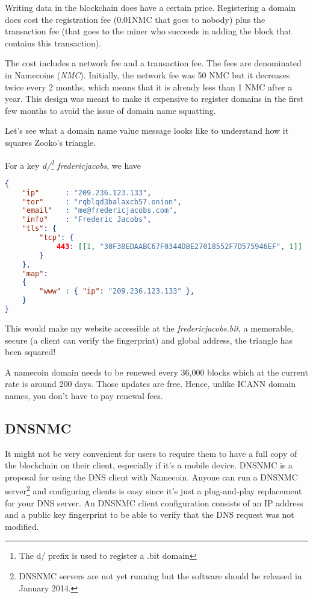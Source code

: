 \documentclass{vldb}
\begin{document}
Writing data in the blockchain does have a certain price. Registering a domain does cost the registration fee (0.01NMC that goes to nobody) plus the transaction fee (that goes to the miner who succeeds in adding the block that contains this transaction).

The cost includes a network fee and a transaction fee. The fees are denominated in Namecoins (\emph{NMC}). Initially, the network fee was 50 NMC but it decreases twice every 2 months, which means that it is already less than 1 NMC after a year. This design was meant to make it expensive to register domains in the first few months to avoid the issue of domain name squatting.

Let's see what a domain name value message looks like to understand how it squares Zooko's triangle.

For a key \emph{d/\footnote{The d/ prefix is used to register a .bit domain} fredericjacobs}, we have 

\begin{lstlisting}[language=json,firstnumber=1]
{
    "ip"      : "209.236.123.133",
    "tor"     : "rqblqd3balaxcb57.onion",
    "email"   : "me@fredericjacobs.com",
    "info"    : "Frederic Jacobs",
    "tls": {
        "tcp": {
            443: [[1, "30F38EDAABC67F0344DBE27018552F7D575946EF", 1]]
        }
    },
    "map":
    {
        "www" : { "ip": "209.236.123.133" },
    }
}
\end{lstlisting}

This would make my website accessible at the \emph{fredericjacobs.bit}, a memorable, secure (a client can verify the fingerprint) and global address, the triangle has been squared!

A namecoin domain needs to be renewed every 36,000 blocks which at the current rate is around 200 days. Those updates are free. Hence, unlike ICANN domain names, you don't have to pay renewal fees.

\subsection{DNSNMC}

It might not be very convenient for users to require them to have a full copy of the blockchain on their client, especially if it's a mobile device. DNSNMC\cite{okTurtles} is a proposal for using the DNS client with Namecoin. Anyone can run a DNSNMC server\footnote{DNSNMC servers are not yet running but the software should be released in January 2014.} and configuring clients is easy since it's just a plug-and-play replacement for your DNS server. An DNSNMC client configuration consists of an IP address and a public key fingerprint to be able to verify that the DNS request was not modified. 
\end{document}
